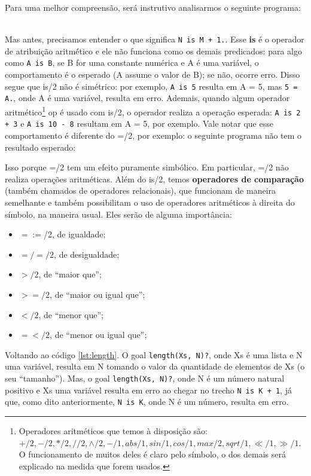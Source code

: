\documentclass{article}
\theoremstyle{remark}
\begin{document}
Para uma melhor compreensão, será instrutivo analisarmos o seguinte programa:
\\
\\


\label{lst:length}

Mas antes, precisamos entender o que significa {\tt N is M + 1.}. Esse \textbf{is} é o operador de atribuição aritmético e ele não funciona como os demais predicados: para algo como {\tt A is B}, se B for uma constante numérica e A é uma variável, o comportamento é o esperado (A assume o valor de B); se não, ocorre erro. Disso segue que is/2 não é simétrico: por exemplo, {\tt A is 5} resulta em A = 5, mas {\tt 5 = A.},
onde A é uma variável, resulta em erro. Ademais, quando algum
operador aritmético\footnote{Operadores aritméticos que temos à disposição são: $+/2, -/2, */2, //2, \wedge/2, -/1, abs/1, sin/1, cos/1, max/2, sqrt/1, \ll/1, \gg/1$. O funcionamento de muitos deles é claro pelo símbolo, o dos demais será explicado na medida que forem usados.} op é usado com is/2, o operador realiza a operação esperada: {\tt A is 2 + 3} e {\tt A is 10 - 8} resultam em A = 5, por exemplo. Vale notar que esse comportamento é diferente do =/2, por exemplo: o seguinte programa não tem o resultado esperado:



\noindent Isso porque =/2 tem um efeito puramente simbólico. Em particular, =/2 não realiza operações aritméticas. Além do is/2, temos \textbf{operadores de comparação} (também chamados de operadores relacionais), que funcionam de maneira semelhante e também possibilitam o uso de operadores aritméticos à direita do símbolo, na maneira usual. Eles serão de alguma importância:

\begin{itemize}
  \item $=:=$/2, de igualdade;
  \item $=/=/2$, de desigualdade;
  \item $>/2  $, de ``maior que'';
  \item $>=/2$, de ``maior ou igual que'';
  \item $</2 $, de ``menor que'';
  \item $=</2$, de ``menor ou igual que'';
\end{itemize}

Voltando ao código \ref{lst:length}. %
O goal {\tt length(Xs, N)?}, onde Xs é uma lista e N uma variável, resulta em N tomando o valor da quantidade de elementos de Xs (o seu ``tamanho'').  Mas, o goal {\tt length(Xs, N)?}, onde N é um número natural positivo e Xs uma variável resulta em erro ao chegar no trecho {\tt N is K + 1}, já que, como dito anteriormente, {\tt N is K}, onde N é um número, resulta em erro.
\end{document}
